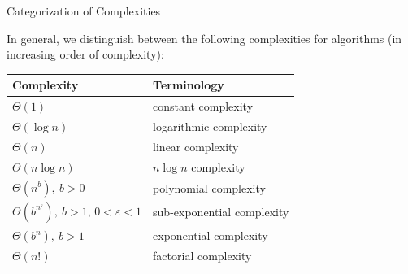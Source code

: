 \documentclass[smaller,hyperref={CJKbookmarks=true}]{beamer}
\begin{document}
\begin{frame}[c]{Categorization of Complexities}
\begin{spacing}{1.15}
In general, we distinguish between the following complexities for
algorithms (in increasing order of complexity):
\begin{center}
  \begin{tabular}{ll}
  \toprule
    Complexity & Terminology \\ \midrule
    $\Theta(1)$ & constant complexity \\
    $\Theta(\log n)$ & logarithmic complexity \\
    $\Theta(n)$ & linear complexity \\
    $\Theta(n\log n)$ & $n\log n$ complexity \\
    $\Theta(n^b),~b>0$ & polynomial complexity \\
    $\Theta(b^{n^\varepsilon}),\:b>1,\,0<\varepsilon<1$ & sub-exponential complexity \\
    $\Theta(b^n),~b>1$ & exponential complexity \\
    $\Theta(n!)$ & factorial complexity \\
  \bottomrule
  \end{tabular}
\end{center}
\end{spacing}
\end{frame}
\end{document}
